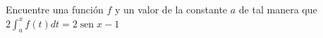 \item Encuentre una función $f$ y un valor de la constante $a$ de tal manera que $\displaystyle 2 \int_a^x f(t) dt = 2 \operatorname{sen} x - 1$
